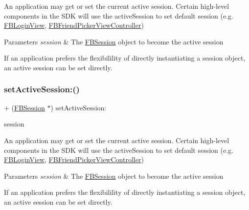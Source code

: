 An application may get or set the current active session. Certain high-\/level components in the S\+DK will use the active\+Session to set default session (e.\+g. {\ttfamily \hyperlink{interfaceFBLoginView}{F\+B\+Login\+View}}, {\ttfamily \hyperlink{interfaceFBFriendPickerViewController}{F\+B\+Friend\+Picker\+View\+Controller}})


\begin{DoxyParams}{Parameters}
{\em session} & The \hyperlink{interfaceFBSession}{F\+B\+Session} object to become the active session\\
\hline
\end{DoxyParams}
If an application prefers the flexibilility of directly instantiating a session object, an active session can be set directly. \mbox{\label{interfaceFBSession_af1b30bea1e3251f8d75f76b10369756e}} 
\subsubsection{\texorpdfstring{set\+Active\+Session\+:()}{setActiveSession:()}\hspace{0.1cm}{\footnotesize\ttfamily [5/5]}}
{\footnotesize\ttfamily + (\hyperlink{interfaceFBSession}{F\+B\+Session} $\ast$) set\+Active\+Session\+: \begin{DoxyParamCaption}\item[{(\hyperlink{interfaceFBSession}{F\+B\+Session} $\ast$)}]{session }\end{DoxyParamCaption}}

An application may get or set the current active session. Certain high-\/level components in the S\+DK will use the active\+Session to set default session (e.\+g. {\ttfamily \hyperlink{interfaceFBLoginView}{F\+B\+Login\+View}}, {\ttfamily \hyperlink{interfaceFBFriendPickerViewController}{F\+B\+Friend\+Picker\+View\+Controller}})


\begin{DoxyParams}{Parameters}
{\em session} & The \hyperlink{interfaceFBSession}{F\+B\+Session} object to become the active session\\
\hline
\end{DoxyParams}
If an application prefers the flexibilility of directly instantiating a session object, an active session can be set directly. \mbox{\label{interfaceFBSession_afb4f41ffcd4d824a16147cb41b932a32}} 
